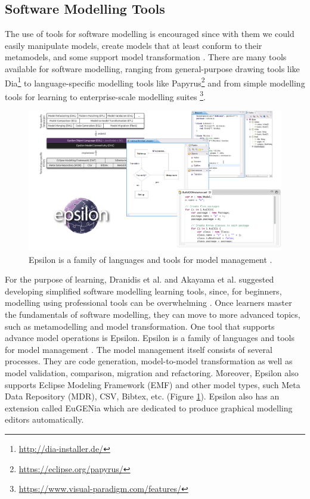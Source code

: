 \documentclass[12pt, a4paper]{report}
\begin{document}
{\subsection{Software Modelling Tools}
The use of tools for software modelling is encouraged since with them we could easily manipulate models, create models that at least conform to their metamodels, and some support model transformation \cite{brambilla2012model}. There are many tools available for software modelling, ranging from general-purpose drawing tools like Dia\footnote{\url{http://dia-installer.de/}} to language-specific modelling tools like Papyrus\footnote{\url{https://eclipse.org/papyrus/}} and from  simple modelling tools for learning \cite{dranidis2015learning} to enterprise-scale modelling suites \footnote{\url{https://www.visual-paradigm.com/features/}}. 

\begin{figure}[!ht]
\centering
\includegraphics[width=\textwidth]{epsilon}
\caption{Epsilon is a family of languages and tools for model management \cite{kolovos2010epsilon}.}
\label{epsilon}
\end{figure}

For the purpose of learning, Dranidis et al. and Akayama et al. suggested developing simplified software modelling learning tools, since, for beginners, modelling using professional tools can be overwhelming \cite{dranidis2015learning, Akayama2013}. Once learners master the fundamentals of software modelling, they can move to more advanced topics, such as metamodelling and model transformation. One tool that supports advance model operations is Epsilon. Epsilon is a family of languages and tools for model management \cite{kolovos2010epsilon}. The model management itself consists of several processes. They are code generation, model-to-model transformation as well as model validation, comparison, migration and refactoring. Moreover, Epsilon also supports Eclipse Modeling Framework (EMF) and other model types, such Meta Data Repository (MDR), CSV, Bibtex, etc. (Figure \ref{epsilon}). Epsilon also has an extension called EuGENia which are dedicated to produce graphical modelling editors automatically\cite{kolovos2015eugenia}.

}
\end{document}
